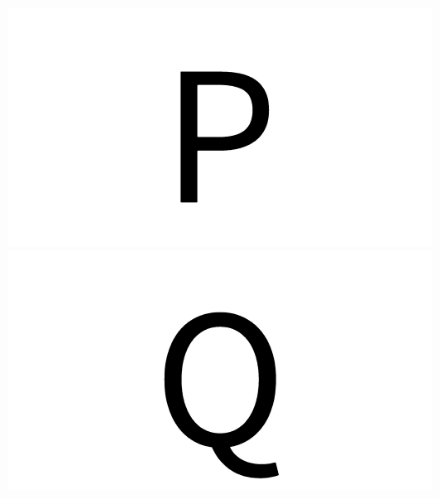 \documentclass{article}
\begin{document}
\begin{figure}[H]
  \includegraphics[width=\linewidth]{u_P}
\endminipage\hfill
{}
  \includegraphics[width=\linewidth]{u_Q}
\endminipage\hfill
\end{figure}
\end{document}
